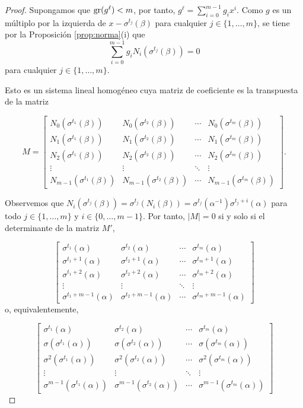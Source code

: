 \begin{proof}
Supongamos que $\operatorname{gr}(g^\ell) < m$, por tanto, $g^\ell = \sum_{i=0}^{m-1}g_ix^i$. Como $g$ es un múltiplo por la izquierda de $x - \sigma^{t_j}(\beta)$ para cualquier $j \in \{1,\dots,m\}$, se tiene por la Proposición \ref{prop:norma}(i) que 
\begin{equation}\label{eq:sishom}
\sum_{i=0}^{m-1}g_iN_i(\sigma^{t_j}(\beta)) = 0
\end{equation}
para cualquier  $j \in \{1,\dots,m\}$.

Esto es un sistema lineal homogéneo cuya matriz de coeficiente es la transpuesta de la matriz

\[ M = 
\begin{bmatrix}
N_0(\sigma^{t_1}(\beta)) & N_0(\sigma^{t_2}(\beta)) & \cdots & N_0(\sigma^{t_m}(\beta)) \\
N_1(\sigma^{t_1}(\beta)) & N_1(\sigma^{t_2}(\beta)) & \cdots & N_1(\sigma^{t_m}(\beta)) \\
N_2(\sigma^{t_1}(\beta)) & N_2(\sigma^{t_2}(\beta)) & \cdots & N_2(\sigma^{t_m}(\beta)) \\
\vdots & \vdots & \ddots & \vdots \\
N_{m-1}(\sigma^{t_1}(\beta)) & N_{m-1}(\sigma^{t_2}(\beta)) & \cdots & N_{m-1}(\sigma^{t_m}(\beta))
\end{bmatrix}.
\]

Observemos que $N_i(\sigma^{t_j}(\beta)) = \sigma^{t_j}(N_i(\beta)) = \sigma^{t_j}(\alpha^{-1})\sigma^{t_j+i}(\alpha)$ para todo  $j \in \{1,\dots,m\}$ y $i \in \{0,\dots,m-1\}$. Por tanto, $|M| = 0$ si y solo si el determinante de la matriz $M'$,

\[
\begin{bmatrix}
\sigma^{t_1}(\alpha) & \sigma^{t_2}(\alpha) & \cdots & \sigma^{t_m}(\alpha) \\
\sigma^{t_1+1}(\alpha) & \sigma^{t_2+1}(\alpha) & \cdots & \sigma^{t_m+1}(\alpha) \\
\sigma^{t_1+2}(\alpha) & \sigma^{t_2+2}(\alpha) & \cdots & \sigma^{t_m+2}(\alpha) \\
\vdots & \vdots & \ddots & \vdots \\
\sigma^{t_1+m-1}(\alpha) & \sigma^{t_2+m-1}(\alpha) & \cdots & \sigma^{t_m+m-1}(\alpha)
\end{bmatrix}
\]
o, equivalentemente,

\[
\begin{bmatrix}
\sigma^{t_1}(\alpha) & \sigma^{t_2}(\alpha) & \cdots & \sigma^{t_m}(\alpha) \\
\sigma(\sigma^{t_1}(\alpha)) & \sigma(\sigma^{t_2}(\alpha)) & \cdots & \sigma(\sigma^{t_m}(\alpha)) \\
\sigma^2(\sigma^{t_1}(\alpha)) & \sigma^2(\sigma^{t_2}(\alpha)) & \cdots & \sigma^2(\sigma^{t_m}(\alpha)) \\
\vdots & \vdots & \ddots & \vdots \\
\sigma^{m-1}(\sigma^{t_1}(\alpha)) & \sigma^{m-1}(\sigma^{t_2}(\alpha)) & \cdots & \sigma^{m-1}(\sigma^{t_m}(\alpha))
\end{bmatrix}
\]


\end{proof}
